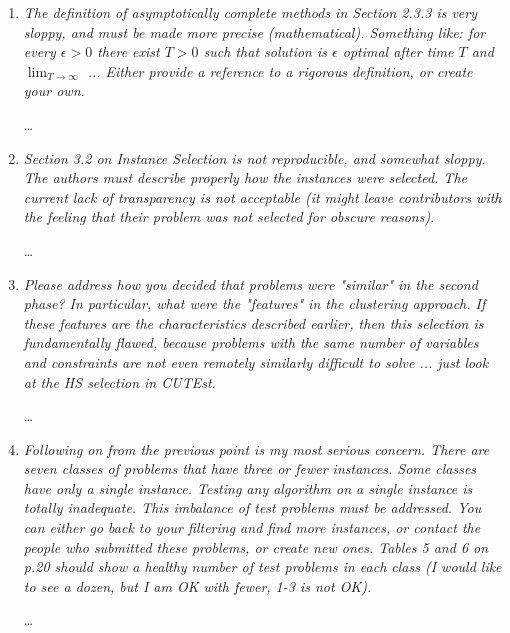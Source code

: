 \documentclass[11pt]{article}
\newcommand{\rep}[1]{{\textcolor{acblue}{#1}}}
\begin{document}
\begin{enumerate}
\rep{\dots}

\item 
{\it
 The definition of asymptotically complete methods in Section 2.3.3 is very sloppy, 
and must be made more precise (mathematical). Something like: for every $\epsilon>0$ 
there exist $T>0$ such that solution is $\epsilon$ optimal after time $T$ and 
$\lim_{T\to\infty}$ ... Either provide a reference to a rigorous definition, or create 
your own. 
}

\rep{\dots}

\item 
{\it
 Section 3.2 on Instance Selection is not reproducible, and somewhat sloppy. The authors 
must describe properly how the instances were selected. The current lack of transparency 
is not acceptable (it might leave contributors with the feeling that their problem was 
not selected for obscure reasons). 
}


\rep{\dots}

\item 
{\it
Please address how you decided that problems were "similar" in the second phase? 
In particular, what were the "features" in the clustering approach. If these features 
are the characteristics described earlier, then this selection is fundamentally flawed, 
because problems with the same number of variables and constraints are not even remotely 
similarly difficult to solve ... just look at the HS selection in CUTEst. 
}

\rep{\dots}

\item 
{\it
 Following on from the previous point is my most serious concern. There are seven classes 
of problems that have three or fewer instances. Some classes have only a single instance. 
Testing any algorithm on a single instance is totally inadequate. This imbalance of 
test problems must be addressed. You can either go back to your filtering and find more 
instances, or contact the people who submitted these problems, or create new ones. 
Tables 5 and 6 on p.20 should show a healthy number of test problems in each class (I 
would like to see a dozen, but I am OK with fewer, 1-3 is not OK).
}

\rep{\dots}

 \end{enumerate}
\end{document}
